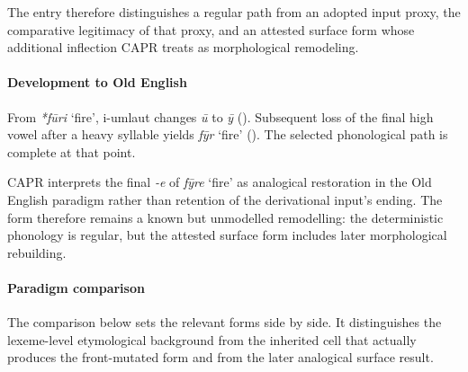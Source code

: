 \documentclass[
  british,
  a4paper,
]{article}
\providecommand{\Recon}[1]{\emph{*#1}}
\begin{document}
The entry therefore distinguishes a regular path from an adopted input
proxy, the comparative legitimacy of that proxy, and an attested surface
form whose additional inflection CAPR treats as morphological
remodeling.

\paragraph{Development to Old
English}\label{development-to-old-english-152}

From \Recon{fūri} `fire', i-umlaut changes \emph{ū} to \emph{ȳ}
().
Subsequent loss of the final high vowel after a heavy syllable yields
{\emph{fȳr}} `fire' (). The selected phonological path is complete at that point.

CAPR interprets the final \emph{-e} of {\emph{fȳre}} `fire' as
analogical restoration in the Old English paradigm rather than retention
of the derivational input's ending. The form therefore remains a known
but unmodelled remodelling: the deterministic phonology is regular, but
the attested surface form includes later morphological rebuilding.

\paragraph{Paradigm comparison}\label{paradigm-comparison-25}

The comparison below sets the relevant forms side by side. It
distinguishes the lexeme-level etymological background from the
inherited cell that actually produces the front-mutated form and from
the later analogical surface result.
\end{document}
